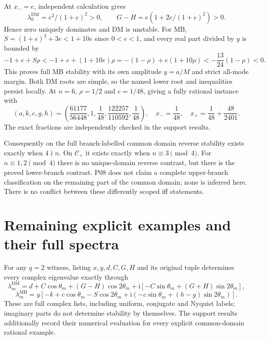 \documentclass[11pt]{article}
\newcommand{\DM}{\mathrm{DM}}
\newcommand{\MB}{\mathrm{MB}}
\begin{document}
At $x_-=e$, independent calculation gives
\[
 \lambda_0^{\DM}=e^2/(1+e)^2>0,\qquad
 G-H=e\left(1+2e/(1+e)^2\right)>0.
\]
Hence zero uniquely dominates and DM is unstable. For MB,
$S=(1+e)^3+3e<1+10e$ since $0<e<1$, and every real part divided
by $y$ is bounded by
\[
 -1+e+S\rho<-1+e+(1+10e)\rho
 =-(1-\rho)+e(1+10\rho)
 <-\frac{13}{24}(1-\rho)<0.
\]
This proves full MB stability with its own amplitude $y=a/M$ and
strict all-mode margin. Both DM roots are simple, so the named lower
root and inequalities persist locally. At $n=6$, $\rho=1/2$ and
$e=1/48$, giving a fully rational instance with
\[
 (a,k,c,g,h)=\left(\frac{61177}{56448},1,\frac1{48},
                       \frac{122257}{110592},\frac1{48}\right),
 \quad x_-=\frac1{48},\quad x_+=\frac1{48}+\frac{48}{2401}.
\]
The exact fractions are independently checked in the support results.

Consequently on the full branch-labelled common domain reverse
stability exists exactly when $4\nmid n$. On $\mathcal C_+$ it
exists exactly when $n\equiv3\pmod4$. For $n\equiv1,2\pmod4$
there is no unique-domain reverse contrast, but there is the proved
lower-branch contrast. P08 does not claim a complete upper-branch
classification on the remaining part of the common domain; none is
inferred here. There is no conflict between these differently scoped
iff statements.

\section{Remaining explicit examples and their full spectra}
For any $q=2$ witness, listing $x,y,d,C,G,H$ and its original tuple
determines every complex eigenvalue exactly through
\[
 \lambda_m^{\DM}=d+C\cos\theta_m+(G-H)\cos2\theta_m
        +\mathrm i[-C\sin\theta_m+(G+H)\sin2\theta_m],
\]
\[
 \lambda_m^{\MB}=y[-k+c\cos\theta_m-S\cos2\theta_m
        +\mathrm i(-c\sin\theta_m+(h-g)\sin2\theta_m)].
\]
These are full complex lists, including uniform, conjugate and Nyquist
labels; imaginary parts do not determine stability by themselves.
The support results additionally record their numerical evaluation for
every explicit common-domain rational example.
\end{document}
